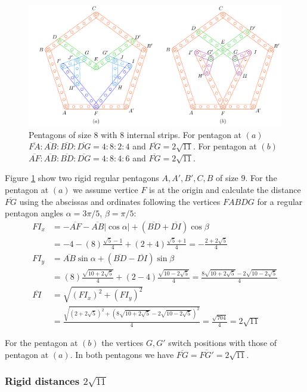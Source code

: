 \documentclass[11pt]{article}
\begin{document}
\begin{figure}[H]
\centering
\includegraphics[scale=1]{8/penta8-8a}
\caption{Pentagons of size 8 with 8 internal strips. For pentagon at $(a)$ $\overline{FA}:\overline{AB}:\overline{BD}:\overline{DG} = 4:8:2:4$ and $\overline{FG}=2\sqrt{11}$. For pentagon at $(b)$ $\overline{AF}:\overline{AB}:\overline{BD}:\overline{DG} = 4:8:4:6$ and $\overline{FG}=2\sqrt{11}$.}
\label{fig:penta8-8a}
\end{figure}

Figure \ref{fig:penta8-8a} show two rigid regular pentagons $A,A',B',C,B$ of size $9$. For the pentagon at $(a)$ we assume vertice $F$ is at the origin and calculate the distance $\overline{FG}$ using the abscissas and ordinates following the vertices $FABDG$ for a regular pentagon angles $\alpha = 3\pi/5$, $\beta=\pi/5$:
\begin{align}
FI_x &= -\overline{AF} - \overline{AB}|\cos\alpha| + (\overline{BD} + \overline{DI})\cos\beta\nonumber\\
 &= -4 -(8)\frac{\sqrt5-1}4 + (2+4)\frac{\sqrt5+1}4 = -\frac{2+2\sqrt5}4\\
FI_y &= \overline{AB}\sin\alpha + (\overline{BD}-\overline{DI})\sin\beta\nonumber\\
 &= (8)\frac{\sqrt{10+2\sqrt5}}4 + (2-4)\frac{\sqrt{10-2\sqrt5}}4
 = \frac{8\sqrt{10+2\sqrt5} - 2\sqrt{10-2\sqrt5}}4\\
\overline{FI} &= \sqrt{(FI_x)^2 + (FI_y)^2}\nonumber\\
 &= \frac{\sqrt{(2+2\sqrt5)^2 + (8\sqrt{10+2\sqrt5} - 2\sqrt{10-2\sqrt5})^2}}4
 = \frac{\sqrt{704}}4 = 2\sqrt{11}
\end{align}

For the pentagon at $(b)$ the vertices $G,G'$ switch positions with those of pentagon at $(a)$. In both pentagons we have $\overline{FG} = \overline{FG'} = 2\sqrt{11}$.


\subsubsection{Rigid distances $2\sqrt{11}$}
\end{document}
